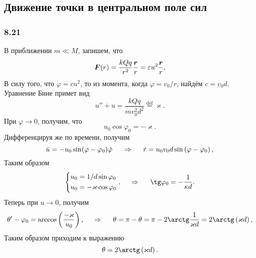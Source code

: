 \subsection{Движение точки в центральном поле сил}


\subsubsection*{8.21}

В приближении $m \ll M$, запишем, что
$$
    \mbox{\boldmath $F$}(r) = \frac{kQq}{r^2} \frac{\mbox{\boldmath $r$}}{r} = \varepsilon u^2 \frac{\mbox{\boldmath $r$}}{r},
$$
В силу того, что $\dot{\varphi} = cu^2$, то из момента, когда $\dot{\varphi} = v_0 / r$, найдём $c=v_0 d$.
Уравнение Бине примет вид
\begin{equation}
    u'' + u = \frac{kQq}{mv_0^2 d^2} 
    \overset{\mathrm{def}}{=} \varkappa.
\end{equation}
При $\varphi \to 0$, получим, что
$$
    u_0 \cos \varphi_0 = -\varkappa.
$$
Дифференцируя же по времени, получим
$$
    \dot{u} = - u_0 \sin (\varphi - \varphi_0) \dot{\varphi}
    \hspace{0.5cm} \Rightarrow \hspace{0.5cm} 
    \dot{r} = u_0 v_0 d \sin \left(\varphi - \varphi_0\right),
$$
Таким образом
$$
    \left\{\begin{aligned}
        u_0 &= 1 / d \sin \varphi_0 \\
        u_0 &= - \varkappa  \cos \varphi_0
    \end{aligned}\right. ,
    \hspace{0.5cm} \Rightarrow \hspace{0.5cm} 
    \tg \varphi_0 = - \frac{1}{\kappa d}.
$$
Теперь при $u \to 0$, получим
$$
    \theta' - \varphi_0 = \arccos \left(\frac{-\varkappa}{u_0} \right),
    \hspace{0.5cm} \Rightarrow \hspace{0.5cm} 
    \theta = \pi - \theta = \pi - 2 \arctg \frac{1}{\varkappa d} 
    =
    2 \arctg \left(\varkappa d\right),
$$
Таким образом приходим к выражению
\begin{equation}
    \theta = 2 \arctg \left(\varkappa d\right).
\end{equation}

